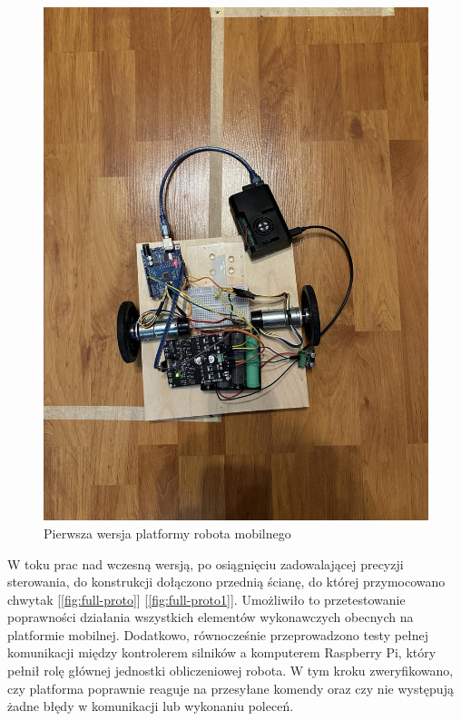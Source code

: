 \begin{figure}[H]
  \centering
  \includegraphics[width=1.0\textwidth]{./graf/proto-1.jpg}
  \caption{Pierwsza wersja platformy robota mobilnego}
  \label{zdj:proto-1}
\end{figure}

\clearpage

W toku prac nad wczesną wersją, po osiągnięciu zadowalającej precyzji sterowania, do konstrukcji dołączono przednią ścianę, do której przymocowano chwytak [\ref{fig:full-proto}] [\ref{fig:full-proto1}]. Umożliwiło to przetestowanie poprawności działania wszystkich elementów wykonawczych obecnych na platformie mobilnej. Dodatkowo, równocześnie przeprowadzono testy pełnej komunikacji między kontrolerem silników a komputerem Raspberry Pi, który pełnił rolę głównej jednostki obliczeniowej robota. W tym kroku zweryfikowano, czy platforma poprawnie reaguje na przesyłane komendy oraz czy nie występują żadne błędy w komunikacji lub wykonaniu poleceń.

